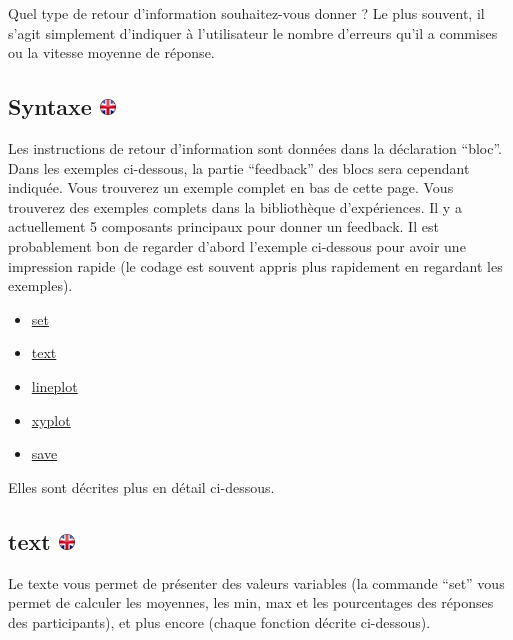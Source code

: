 \documentclass[
]{book}
\providecommand{\tightlist}{%
  \setlength{\itemsep}{0pt}\setlength{\parskip}{0pt}}
\begin{document}
Quel type de retour d'information souhaitez-vous donner ? Le plus
souvent, il s'agit simplement d'indiquer à l'utilisateur le nombre
d'erreurs qu'il a commises ou la vitesse moyenne de réponse.

\hypertarget{syntaxe-ukflag}{%
\subsection[Syntaxe ]{\texorpdfstring{Syntaxe
\href{https://www.psytoolkit.org/doc3.1.0/feedback.html\#_syntax}{\protect\includegraphics{img/ukflag.png}}}{Syntaxe ukflag}}\label{syntaxe-ukflag}}

Les instructions de retour d'information sont données dans la
déclaration ``bloc''. Dans les exemples ci-dessous, la partie
``feedback'' des blocs sera cependant indiquée. Vous trouverez un
exemple complet en bas de cette page. Vous trouverez des exemples
complets dans la bibliothèque d'expériences. Il y a actuellement 5
composants principaux pour donner un feedback. Il est probablement bon
de regarder d'abord l'exemple ci-dessous pour avoir une impression
rapide (le codage est souvent appris plus rapidement en regardant les
exemples).

\begin{itemize}
\tightlist
\item
  \protect\hyperlink{feedbackset}{set}
\item
  \protect\hyperlink{feedbacktext}{text}
\item
  \href{feedbacklineplot}{lineplot}
\item
  \href{feedbacklineplot}{xyplot}
\item
  \href{feedbacksave}{save}
\end{itemize}

Elles sont décrites plus en détail ci-dessous.

\hypertarget{text-ukflag}{%
\subsection[text ]{\texorpdfstring{text
\href{https://www.psytoolkit.org/doc3.1.0/feedback.html\#_text}{\protect\includegraphics{img/ukflag.png}}}{text ukflag}}\label{text-ukflag}}

Le texte vous permet de présenter des valeurs variables (la commande
``set'' vous permet de calculer les moyennes, les min, max et les
pourcentages des réponses des participants), et plus encore (chaque
fonction décrite ci-dessous).
\end{document}
